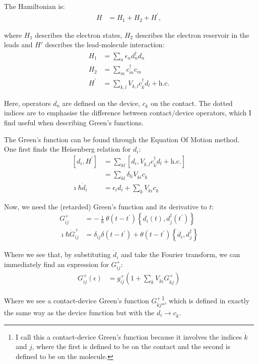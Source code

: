 The Hamiltonian is:
\begin{align}
H &= H_1 + H_2 + H^\prime, \label{eq:hamiltonian}
\end{align}

where $H_1$ describes the electron states, $H_2$ describes the electron reservoir in the leads and $H'$ describes the lead-molecule interaction:
\begin{align*}
H_1 &= \sum_n \epsilon_n d^\dagger_n d_n \\
H_2 &= \sum_{\dot{m}} c^\dagger_{\dot{m}} c_{\dot{m}} \\
H^\prime &= \sum_{\dot{k}, l} V_{\dot{k}, l} c^\dagger_{\dot{k}} d_l + \text{h.c.}
\end{align*}

Here, operators $d_n$ are defined on the device, $c_{\dot{k}}$ on the contact. The dotted indices are to emphasise the difference between contact/device operators, which I find useful when describing Green's functions. 

The Green's function can be found through the Equation Of Motion method. One first finds the Heisenberg relation for $d_i$:
\begin{align*}
\left[ d_i, H^\prime\right] &= \sum_{\dot{k}l}\left[d_i, V_{\dot{k}, l} c^\dagger_{\dot{k}} d_l + \text{h.c.}\right] \\
&= \sum_{\dot{k}l}\delta_{li} V_{\dot{k}i} c_{\dot{k}}\\
\imath\hbar \dot{d}_i &= \epsilon_i d_i + \sum_{\dot{k}}V_{\dot{k}i} c_{\dot{k}}
\end{align*}

Now, we need the (retarded) Green's function and its derivative to $t$:
\begin{align*}
G_{ij}^+ &= - \frac{\imath}{\hbar} \theta(t-t^\prime) \left\{ d_i(t), d_j^\dagger(t^\prime) \right\} \\
\imath\hbar \dot{G}_{ij}^+ &= \delta_{ij} \delta(t - t^\prime) + \theta(t-t^\prime) \left\{ \dot{d}_i, d_j^\dagger\right\}
\end{align*}

Where we see that, by substituting $\dot{d}_i$ and take the Fourier transform, we can immediately find an expression for $G_{ij}^+$:
\begin{align*} 
G_{ij}^+ (\epsilon) &= g_{ij}^+ \left( 1 + \sum_{\dot{k}} V_{\dot{k}i} G_{\dot{k}j}^+ \right)
\end{align*}

Where we see a contact-device Green's function $G_{\dot{k}j}^+$\footnote{I call this a contact-device Green's function because it involves the indices $\dot{k}$ and $j$, where the first is defined to be on the contact and the second is defined to be on the molecule.}, which is defined in exactly the same way as the device function but with the $d_i \rightarrow c_{\dot{k}}$.

